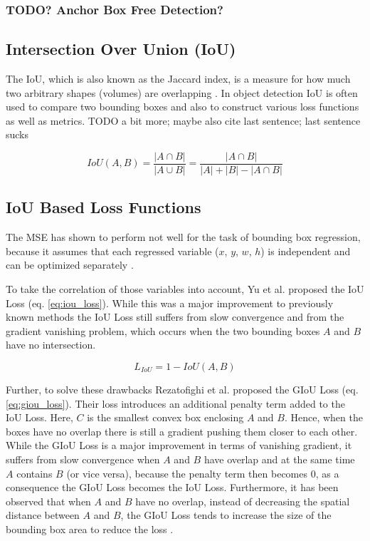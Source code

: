 \subsubsection{TODO? Anchor Box Free Detection?}


\subsection{Intersection Over Union (IoU)}

The \ac{IoU}, which is also known as the Jaccard index, is a measure for how much two arbitrary shapes (volumes) are overlapping \cite{giou}.
In object detection \ac{IoU} is often used to compare two bounding boxes and also to construct various loss functions as well as metrics. TODO a bit more; maybe also cite last sentence; last sentence sucks

\begin{equation}
    IoU(A, B) = \frac{|A \cap B|}{|A \cup B|} = \frac{| A \cap B |}{|A| + |B| - |A \cap B|}
\end{equation}


\subsection{IoU Based Loss Functions}

The \ac{MSE} has shown to perform not well for the task of bounding box regression, because it assumes that each regressed variable ($x$, $y$, $w$, $h$) is independent and can be optimized separately \cite{iou}.

To take the correlation of those variables into account, Yu et al. \cite{iou} proposed the \ac{IoU} Loss (eq. \ref{eq:iou_loss}).
While this was a major improvement to previously known methods the \ac{IoU} Loss still suffers from slow convergence and from the gradient vanishing problem, which occurs when the two bounding boxes $A$ and $B$ have no intersection.

\begin{equation}
    L_{IoU} = 1 - IoU(A, B)
    \label{eq:iou_loss}
\end{equation}

Further, to solve these drawbacks Rezatofighi et al. \cite{giou} proposed the \ac{GIoU} Loss (eq. \ref{eq:giou_loss}).
Their loss introduces an additional penalty term added to the \ac{IoU} Loss.
Here, $C$ is the smallest convex box enclosing $A$ and $B$.
Hence, when the boxes have no overlap there is still a gradient pushing them closer to each other.
While the \ac{GIoU} Loss is a major improvement in terms of vanishing gradient, it suffers from slow convergence when $A$ and $B$ have overlap and at the same time $A$ contains $B$ (or vice versa), because the penalty term then becomes $0$, as a consequence the \ac{GIoU} Loss becomes the \ac{IoU} Loss.
Furthermore, it has been observed that when $A$ and $B$ have no overlap, instead of decreasing the spatial distance between $A$ and $B$, the \ac{GIoU} Loss tends to increase the size of the bounding box area to reduce the loss \cite{eiou}.

